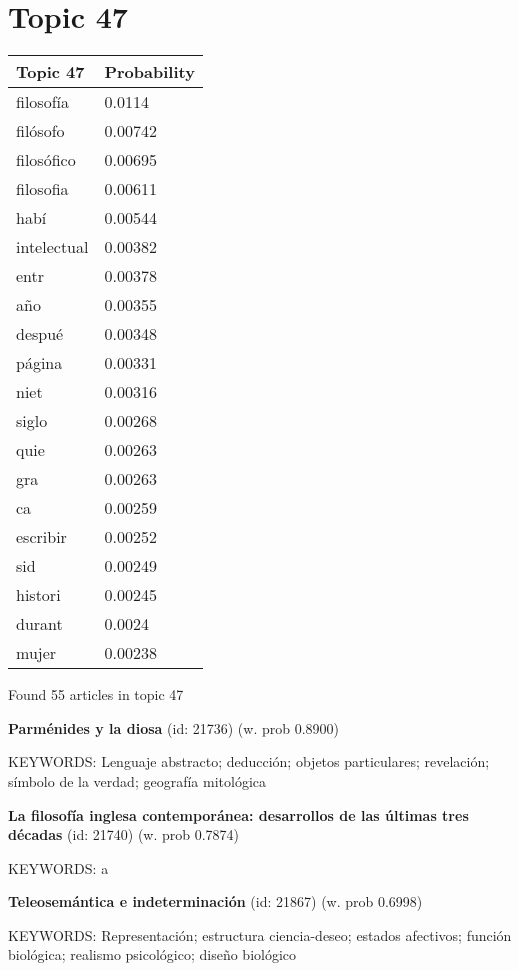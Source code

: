 \documentclass{article}
\begin{document}
\section*{Topic 47}\vfill
\begin{tabular}{ll}
\toprule
    Topic 47 & Probability \\
\midrule
   filosofía &      0.0114 \\
    filósofo &     0.00742 \\
  filosófico &     0.00695 \\
   filosofia &     0.00611 \\
        habí &     0.00544 \\
 intelectual &     0.00382 \\
        entr &     0.00378 \\
         año &     0.00355 \\
      despué &     0.00348 \\
      página &     0.00331 \\
        niet &     0.00316 \\
       siglo &     0.00268 \\
        quie &     0.00263 \\
         gra &     0.00263 \\
          ca &     0.00259 \\
    escribir &     0.00252 \\
         sid &     0.00249 \\
     histori &     0.00245 \\
      durant &      0.0024 \\
       mujer &     0.00238 \\
\bottomrule
\end{tabular}

\vfill
Found 55 articles in topic 47
\vfill

\textbf{Parménides y la diosa} (id: 21736)
 (w. prob 0.8900)


KEYWORDS:
Lenguaje abstracto; deducción; objetos particulares; revelación; símbolo de la verdad; geografía mitológica
\vfill

\textbf{La filosofía inglesa contemporánea: desarrollos de las últimas tres décadas} (id: 21740)
 (w. prob 0.7874)


KEYWORDS:
a
\vfill

\textbf{Teleosemántica e indeterminación} (id: 21867)
 (w. prob 0.6998)


KEYWORDS:
Representación; estructura ciencia-deseo; estados afectivos; función biológica; realismo psicológico; diseño biológico
\end{document}
